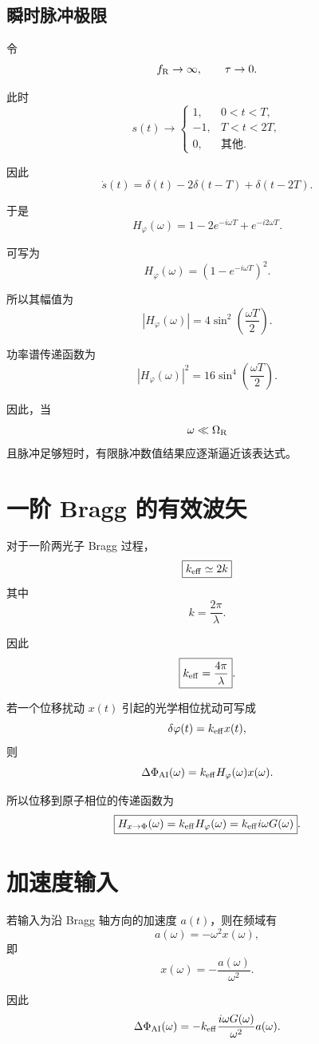 \documentclass[UTF8,12pt,a4paper,fontset=fandol]{ctexart}
\begin{document}
\subsection{瞬时脉冲极限}

令
\[
f_{\rm R}\rightarrow\infty,
\qquad
\tau\rightarrow0.
\]

此时
\[
s(t)
\rightarrow
\begin{cases}
1,&0<t<T,\\
-1,&T<t<2T,\\
0,&\text{其他}.
\end{cases}
\]

因此
\[
\dot s(t)
=
\delta(t)-2\delta(t-T)+\delta(t-2T).
\]

于是
\[
H_\varphi(\omega)
=
1-2e^{-i\omega T}+e^{-i2\omega T}.
\]

可写为
\[
H_\varphi(\omega)
=
(1-e^{-i\omega T})^2.
\]

所以其幅值为
\[
\boxed{
|H_\varphi(\omega)|
=
4\sin^2\left(\frac{\omega T}{2}\right)
}.
\]

功率谱传递函数为
\[
\boxed{
|H_\varphi(\omega)|^2
=
16\sin^4\left(\frac{\omega T}{2}\right)
}.
\]

因此，当
\[
\omega\ll\Omega_{\rm R}
\]
且脉冲足够短时，有限脉冲数值结果应逐渐逼近该表达式。

\section{一阶 Bragg 的有效波矢}

对于一阶两光子 Bragg 过程，
\[
\boxed{
k_{\rm eff}\simeq 2k
}
\]
其中
\[
k=\frac{2\pi}{\lambda}.
\]

因此
\[
\boxed{
k_{\rm eff}
=
\frac{4\pi}{\lambda}
}.
\]

若一个位移扰动 $x(t)$ 引起的光学相位扰动可写成
\[
\delta\varphi(t)
=
k_{\rm eff}x(t),
\]
则
\[
\Delta\Phi_{\rm AI}(\omega)
=
k_{\rm eff}
H_\varphi(\omega)
x(\omega).
\]

所以位移到原子相位的传递函数为
\[
\boxed{
H_{x\rightarrow\Phi}(\omega)
=
k_{\rm eff}H_\varphi(\omega)
=
k_{\rm eff}i\omega G(\omega)
}.
\]

\section{加速度输入}

若输入为沿 Bragg 轴方向的加速度 $a(t)$，则在频域有
\[
a(\omega)
=
-\omega^2x(\omega),
\]
即
\[
x(\omega)
=
-\frac{a(\omega)}{\omega^2}.
\]

因此
\[
\Delta\Phi_{\rm AI}(\omega)
=
-k_{\rm eff}
\frac{i\omega G(\omega)}{\omega^2}
a(\omega).
\]
\end{document}
